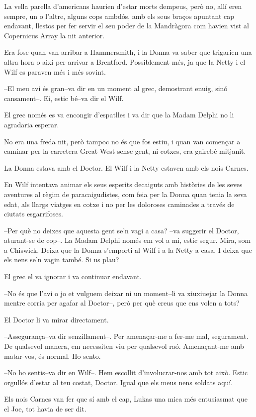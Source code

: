 La vella parella d'americans haurien d'estar morts dempeus, però no,
allí eren sempre, un o l'altre, alguns cops ambdós, amb els seus braços
apuntant cap endavant, llestos per fer servir el seu poder de la
Mandràgora com havien vist al Copernicus Array la nit anterior.

Era fosc quan van arribar a Hammersmith, i la Donna va saber que
trigarien una altra hora o així per arrivar a Brentford. Possiblement
més, ja que la Netty i el Wilf es paraven més i més sovint.

--El meu avi és gran--va dir en un moment al grec, demostrant enuig,
sinó cansament--. Ei, estic bé--va dir el Wilf.

El grec només es va encongir d'espatlles i va dir que la Madam Delphi no
li agradaria esperar.

No era una freda nit, però tampoc no és que fos estiu, i quan van
començar a caminar per la carretera Great West sense gent, ni cotxes,
era gairebé mitjanit.

La Donna estava amb el Doctor. El Wilf i la Netty estaven amb els nois
Carnes.

En Wilf intentava animar els seus esperits decaiguts amb històries de
les seves aventures al règim de paracaigudistes, com feia per la Donna
quan tenia la seva edat, als llargs viatges en cotxe i no per les
doloroses caminades a través de ciutats esgarrifoses.

--Per què no deixes que aquesta gent se'n vagi a casa? --va suggerir el
Doctor, aturant-se de cop--. La Madam Delphi només em vol a mi, estic
segur. Mira, som a Chiswick. Deixa que la Donna s'emporti al Wilf i a la
Netty a casa. I deixa que els nens se'n vagin també. Si us plau?

El grec el va ignorar i va continuar endavant.

--No és que l'avi o jo et vulguem deixar ni un moment--li va xiuxiuejar
la Donna mentre corria per agafar al Doctor--, però per què creus que
ens volen a tots?

El Doctor li va mirar directament.

--Assegurança--va dir senzillament--. Per amenaçar-me a fer-me mal,
segurament. De qualsevol manera, em necessiten viu per qualsevol raó.
Amenaçant-me amb matar-vos, és normal. Ho sento.

--No ho sentis--va dir en Wilf--. Hem escollit d'involucrar-nos amb tot
això. Estic orgullós d'estar al teu costat, Doctor. Igual que els meus
nens soldats aquí.

Els nois Carnes van fer que sí amb el cap, Lukas una mica més
entusiasmat que el Joe, tot havia de ser dit.


